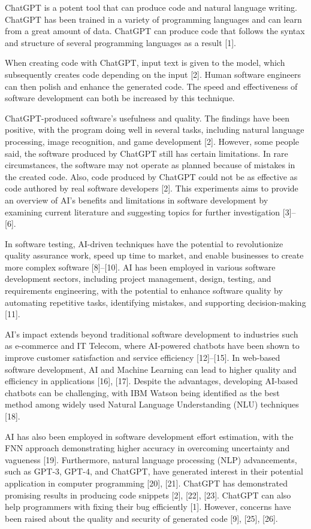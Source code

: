 \documentclass[conference]{IEEEtran}
\begin{document}
ChatGPT is a potent tool that can produce code and natural language writing. ChatGPT has been trained in a variety of programming languages and can learn from a great amount of data. ChatGPT can produce code that follows the syntax and structure of several programming languages as a result [1].

When creating code with ChatGPT, input text is given to the model, which subsequently creates code depending on the input [2]. Human software engineers can then polish and enhance the generated code. The speed and effectiveness of software development can both be increased by this technique.

ChatGPT-produced software's usefulness and quality. The findings have been positive, with the program doing well in several tasks, including natural language processing, image recognition, and game development [2].
However, some people said, the software produced by ChatGPT still has certain limitations. In rare circumstances, the software may not operate as planned because of mistakes in the created code. Also, code produced by ChatGPT could not be as effective as code authored by real software developers [2]. This experiments aims to provide an overview of AI's benefits and limitations in software development by examining current literature and suggesting topics for further investigation [3]–[6]. 

In software testing, AI-driven techniques have the potential to revolutionize quality assurance work, speed up time to market, and enable businesses to create more complex software [8]–[10]. AI has been employed in various software development sectors, including project management, design, testing, and requirements engineering, with the potential to enhance software quality by automating repetitive tasks, identifying mistakes, and supporting decision-making [11].

AI's impact extends beyond traditional software development to industries such as e-commerce and IT Telecom, where AI-powered chatbots have been shown to improve customer satisfaction and service efficiency [12]–[15]. In web-based software development, AI and Machine Learning can lead to higher quality and efficiency in applications [16], [17]. Despite the advantages, developing AI-based chatbots can be challenging, with IBM Watson being identified as the best method among widely used Natural Language Understanding (NLU) techniques [18].

AI has also been employed in software development effort estimation, with the FNN approach demonstrating higher accuracy in overcoming uncertainty and vagueness [19]. Furthermore, natural language processing (NLP) advancements, such as GPT-3, GPT-4, and ChatGPT, have generated interest in their potential application in computer programming [20], [21]. ChatGPT has demonstrated promising results in producing code snippets [2], [22], [23]. ChatGPT can also help programmers with fixing their bug efficiently [1]. However, concerns have been raised about the quality and security of generated code [9], [25], [26].
\end{document}
